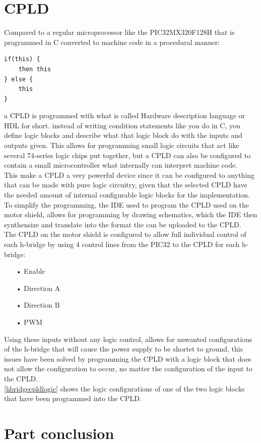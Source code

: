\section{CPLD}
Compared to a regular microprocessor like the PIC32MX320F128H that is programmed in C converted to machine code in a procedural manner:
\begin{lstlisting}
if(this) {
	then this
} else {
	this
}
\end{lstlisting}
a CPLD is programmed with what is called Hardware description language or HDL for short.
instead of writing condition statements like you do in C, you define logic blocks and describe what that logic block do with the inputs and outputs given. \cite{HDL}
This allows for programming small logic circuits that act like several 74-series logic chips put together, but a CPLD can also be configured to contain a small microcontroller what internally can interpret machine code.\\ 
This make a CPLD a very powerful device since it can be configured to anything that can be made with pure logic circuitry, given that the selected CPLD have the needed amount of internal configurable logic blocks for the implementation. \cite{CPLD}
To simplify the programming, the IDE used to program the CPLD used on the motor shield, allows for programming by drawing schematics, which the IDE then synthensize and translate into the format the can be uploaded to the CPLD.\\
The CPLD on the motor shield is configured to allow full individual control of each h-bridge by using 4 control lines from the PIC32 to the CPLD for each h-bridge:
\begin{enumerate}
	\item[•]Enable
	\item[•]Direction A
	\item[•]Direction B
	\item[•]PWM
\end{enumerate}
Using these inputs without any logic control, allows for unwanted configurations of the h-bridge that will cause the power supply to be shortet to ground, this issues have been solved by programming the CPLD with a logic block that does not allow the configuration to occur, no matter the configuration of the input to the CPLD.\\
\ref{hbridgecpldlogic} shows the logic configurations of one of the two logic blocks that have been programmed into the CPLD.
\section{Part conclusion}

